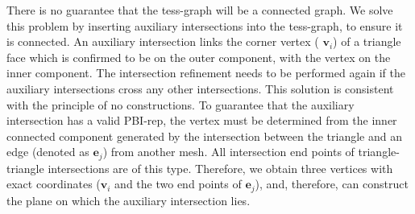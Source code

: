 \vspace{0.5em}%
There is no guarantee that the tess-graph will be a connected graph. We solve this problem by inserting auxiliary intersections into the tess-graph, to ensure it is connected. An auxiliary intersection links the corner vertex ( $\bm{v}_i$) of a triangle face which is confirmed to be on the outer component, with the vertex on the inner component. The intersection refinement needs to be performed again if the auxiliary intersections cross any other intersections. This solution is consistent with the principle of no constructions. To guarantee that the auxiliary intersection has a valid PBI-rep, the vertex must be determined from the inner connected component generated by the intersection between the triangle and an edge (denoted as $\bm{e}_j$) from another mesh. All intersection end points of triangle-triangle intersections are of this type. Therefore, we obtain three vertices with exact coordinates ($\bm{v}_i$ and the two end points of $\bm{e}_j$), and, therefore, can construct the plane on which the auxiliary intersection lies.


